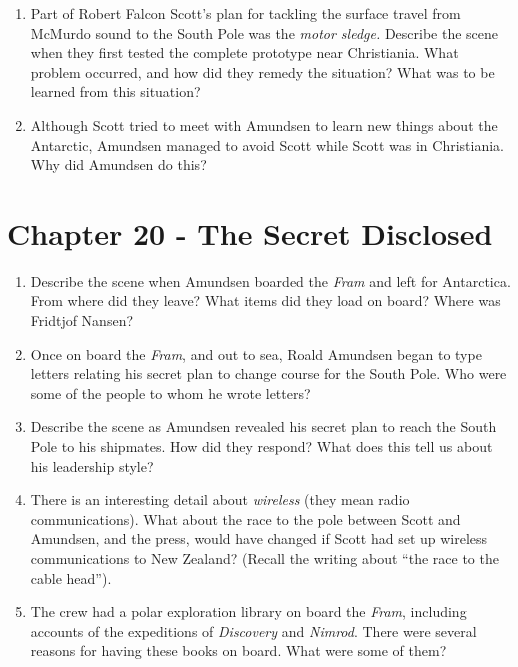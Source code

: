 \documentclass{article}
\begin{document}
\begin{enumerate}
\item Part of Robert Falcon Scott's plan for tackling the surface travel from McMurdo sound to the South Pole was the \textit{motor sledge.}  Describe the scene when they first tested the complete prototype near Christiania.  What problem occurred, and how did they remedy the situation?  What was to be learned from this situation? \\ \vspace{3cm}
\item Although Scott tried to meet with Amundsen to learn new things about the Antarctic, Amundsen managed to avoid Scott while Scott was in Christiania.  Why did Amundsen do this? \\ \vspace{2cm}
\end{enumerate}

\section{Chapter 20 - The Secret Disclosed}
\begin{enumerate}
\item Describe the scene when Amundsen boarded the \textit{Fram} and left for Antarctica.  From where did they leave?  What items did they load on board?  Where was Fridtjof Nansen? \\ \vspace{1.5cm}
\item Once on board the \textit{Fram}, and out to sea, Roald Amundsen began to type letters relating his secret plan to change course for the South Pole.  Who were some of the people to whom he wrote letters?  \\ \vspace{1.5cm}
\item Describe the scene as Amundsen revealed his secret plan to reach the South Pole to his shipmates.  How did they respond?  What does this tell us about his leadership style?  \\ \vspace{1.5cm}
\item There is an interesting detail about \textit{wireless} (they mean radio communications).  What about the race to the pole between Scott and Amundsen, and the press, would have changed if Scott had set up wireless communications to New Zealand?  (Recall the writing about ``the race to the cable head''). \\ \vspace{2.5cm}
\item The crew had a polar exploration library on board the \textit{Fram}, including accounts of the expeditions of \textit{Discovery} and \textit{Nimrod}.  There were several reasons for having these books on board.  What were some of them?
\end{enumerate}
\end{document}
